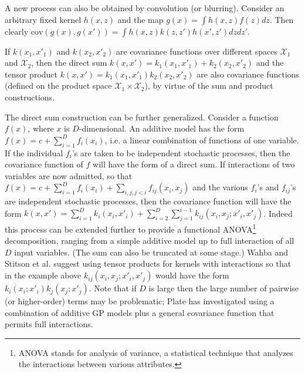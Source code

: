 \documentclass[11pt]{book}
\begin{document}
A new process can also be obtained by convolution (or blurring). Consider an arbitrary fixed kernel $h(x, z)$ and the map $g(x) = \int h(x, z) f(z) dz$. Then clearly $\text{cov}(g(x), g(x')) = \int h(x, z) k(z, z') h(x', z') dz dz'$.

If $k(x_1, x'_1)$ and $k(x_2, x'_2)$ are covariance functions over different spaces $\mathcal{X}_1$ and $\mathcal{X}_2$, then the direct sum $k(x, x') = k_1(x_1, x'_1) + k_2(x_2, x'_2)$ and the tensor product $k(x, x') = k_1(x_1, x'_1) k_2(x_2, x'_2)$ are also covariance functions (defined on the product space $\mathcal{X}_1 \times \mathcal{X}_2$), by virtue of the sum and product constructions.

The direct sum construction can be further generalized. Consider a function $f(x)$, where $x$ is $D$-dimensional. An additive model \cite{hastie1990} has the form $f(x) = c + \sum_{i=1}^D f_i(x_i)$, i.e. a linear combination of functions of one variable. If the individual $f_i$'s are taken to be independent stochastic processes, then the covariance function of $f$ will have the form of a direct sum. If interactions of two variables are now admitted, so that $f(x) = c + \sum_{i=1}^D f_i(x_i) + \sum_{i,j, j<i} f_{ij}(x_i, x_j)$ and the various $f_i$'s and $f_{ij}$'s are independent stochastic processes, then the covariance function will have the form $k(x, x') = \sum_{i=1}^D k_i(x_i, x'_i) + \sum_{i=2}^D \sum_{j=1}^{i-1} k_{ij}(x_i, x_j; x'_i, x'_j)$. Indeed this process can be extended further to provide a functional ANOVA\footnote{ANOVA stands for analysis of variance, a statistical technique that analyzes the interactions between various attributes.} decomposition, ranging from a simple additive model up to full interaction of all $D$ input variables. (The sum can also be truncated at some stage.) Wahba \cite{wahba1990} and Stitson et al. \cite{stitson1999} suggest using tensor products for kernels with interactions so that in the example above $k_{ij}(x_i, x_j; x'_i, x'_j)$ would have the form $k_i(x_i; x'_i) k_j(x_j; x'_j)$. Note that if $D$ is large then the large number of pairwise (or higher-order) terms may be problematic; Plate \cite{plate1999} has investigated using a combination of additive GP models plus a general covariance function that permits full interactions.
\end{document}
